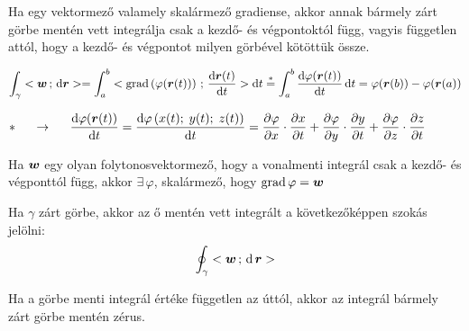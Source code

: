 \documentclass[main.tex]{subfiles}
\begin{document}

Ha egy vektormező valamely skalármező gradiense,
akkor annak bármely zárt görbe mentén vett integrálja
csak a kezdő- és végpontoktól függ,
vagyis független attól, hogy a kezdő- és végpontot
milyen görbével kötöttük össze.

\begin{equation*}
  \int_{\gamma} \scalar{\rvec{w}}{\differential \rvec{r}}
  = \int_a^b \scalar{\grad \left( \varphi(\rvec{r}(t)) \right)}
  {\derivative{\rvec{r}(t)}{t}} \differential t
  \overset{*}{=} \int_a^b \derivative{\varphi(\rvec{r}(t))}{t} \, \differential t
  = \varphi(\rvec{r}(b)) - \varphi(\rvec{r}(a))
\end{equation*}

\begin{equation*}
  * \hspace{5mm} \rightarrow \hspace{5mm}
  \derivative{\varphi(\rvec{r}(t))}{t}
  = \derivative{\varphi\left(
    x(t) ; \; y(t) ; \; z(t)
    \right)}{t}
  = \partialderivative{\varphi}{x} \cdot \partialderivative{x}{t}
  + \partialderivative{\varphi}{y} \cdot \partialderivative{y}{t}
  + \partialderivative{\varphi}{z} \cdot \partialderivative{z}{t}
  \hspace{10mm}
\end{equation*}



Ha $\bm{w}$ egy olyan folytonosvektormező,
hogy a vonalmenti integrál csak a kezdő- és
végponttól függ, akkor $\exists \, \varphi$,
skalármező, hogy $\mathrm{grad} \, \varphi = \bm{w}$




Ha $\gamma$ zárt görbe, akkor az ő mentén vett integrált
a következőképpen szokás jelölni:
\begin{equation*}
  \oint_{\gamma} \scalar{\rvec{w}}{\differential \, \rvec{r}}
\end{equation*}




Ha a görbe menti integrál értéke független az úttól,
akkor az integrál bármely zárt görbe mentén zérus.



\end{document}

